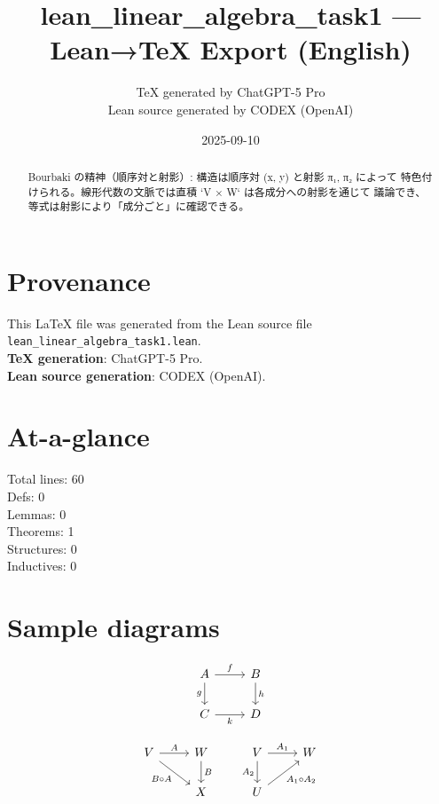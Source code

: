 \documentclass[12pt]{article}
\title{lean\_linear\_algebra\_task1 — Lean→TeX Export (English)}
\author{TeX generated by ChatGPT-5 Pro\\Lean source generated by CODEX (OpenAI)}
\date{2025-09-10}
\begin{document}
\maketitle

\begin{abstract}
Bourbaki の精神（順序対と射影）: 構造は順序対 (x, y) と射影 π₁, π₂ によって
  特色付けられる。線形代数の文脈では直積 `V × W` は各成分への射影を通じて
  議論でき、等式は射影により「成分ごと」に確認できる。
\end{abstract}

\section*{Provenance}
This \LaTeX{} file was generated from the Lean source file \texttt{lean\_linear\_algebra\_task1.lean}.\\
\textbf{TeX generation}: ChatGPT-5 Pro.\\
\textbf{Lean source generation}: CODEX (OpenAI).

\section*{At-a-glance}
Total lines: 60\\
Defs: 0\\
Lemmas: 0\\
Theorems: 1\\
Structures: 0\\
Inductives: 0

\section*{Sample diagrams}

\[
\begin{tikzcd}
A \arrow[r, "f"] \arrow[d, "g"'] & B \arrow[d, "h"] \\
C \arrow[r, "k"'] & D
\end{tikzcd}
\]



\[
\begin{tikzcd}
V \arrow[r, "A"] \arrow[dr, swap, "B\circ A"] & W \arrow[d, "B"] \\
& X
\end{tikzcd}
\qquad
\begin{tikzcd}
V \arrow[r, "A_1"] \arrow[d, "A_2"'] & W \\
U \arrow[ur, swap, "A_1\circ A_2"] &
\end{tikzcd}
\]
\end{document}
